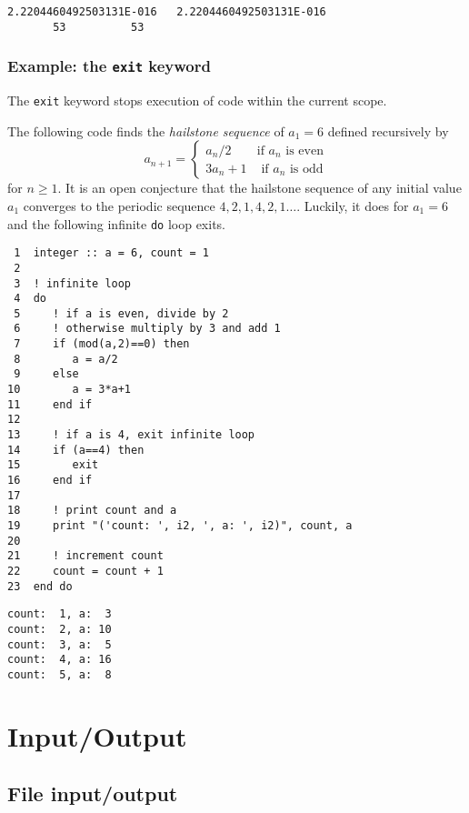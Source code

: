 \documentclass[11pt]{article}
\begin{document}
\begin{verbatim}
2.2204460492503131E-016   2.2204460492503131E-016
       53          53
\end{verbatim}

\subsubsection{Example: the \texttt{exit} keyword}
\label{sec:orgheadline33}
The \texttt{exit} keyword stops execution of code within the current scope.

The following code finds the \emph{hailstone sequence} of \(a_1=6\) defined recursively by
\begin{equation*}
a_{n+1} =
\begin{cases}
a_n/2 & \text{if } a_n \text{ is even}\\
3a_n+1 & \text{ if } a_n \text{ is odd} 
\end{cases}
\end{equation*}
for \(n\geq1\). It is an open conjecture that the hailstone sequence of any initial value \(a_1\) converges to the periodic sequence \(4, 2, 1, 4, 2, 1\ldots\). Luckily, it does for \(a_1=6\) and the following infinite \texttt{do} loop exits.

\begin{verbatim}
 1  integer :: a = 6, count = 1
 2  
 3  ! infinite loop
 4  do
 5     ! if a is even, divide by 2
 6     ! otherwise multiply by 3 and add 1
 7     if (mod(a,2)==0) then
 8        a = a/2
 9     else
10        a = 3*a+1
11     end if
12  
13     ! if a is 4, exit infinite loop
14     if (a==4) then
15        exit
16     end if
17  
18     ! print count and a
19     print "('count: ', i2, ', a: ', i2)", count, a
20  
21     ! increment count
22     count = count + 1
23  end do
\end{verbatim}

\begin{verbatim}
count:  1, a:  3
count:  2, a: 10
count:  3, a:  5
count:  4, a: 16
count:  5, a:  8
\end{verbatim}

\section{Input/Output}
\label{sec:orgheadline40}

\subsection{File input/output}
\label{sec:orgheadline37}
\end{document}
